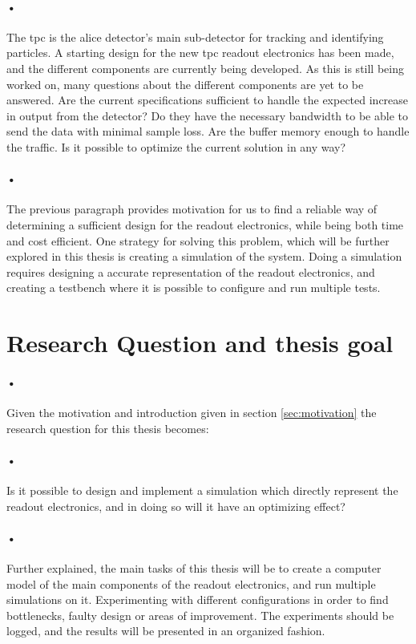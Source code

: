 \documentclass[a4paper, 12pt]{report}\dfrac{\right }{•}
\begin{document}
\paragraph{•}
The \gls{tpc} is the \gls{alice} detector's main sub-detector for tracking and identifying particles.
A starting design for the new \gls{tpc} readout electronics has been made, and the different components are currently being developed.
As this is still being worked on, many questions about the different components are yet to be answered.
Are the current specifications sufficient to handle the expected increase in output from the detector?
Do they have the necessary bandwidth to be able to send the data with minimal sample loss.
Are the buffer memory enough to handle the traffic.
Is it possible to optimize the current solution in any way?

\paragraph{•}
The previous paragraph provides motivation for us to find a reliable way of determining a sufficient design for the readout electronics, while being both time and cost efficient.
One strategy for solving this problem, which will be further explored in this thesis is creating a simulation of the system.
Doing a simulation requires designing a accurate representation of the readout electronics, and creating a testbench where it is possible to configure and run multiple tests.


\section{Research Question and thesis goal}

\paragraph{•}
Given the motivation and introduction given in section \ref{sec:motivation} the research question for this thesis becomes:

\paragraph{•}
Is it possible to design and implement a simulation which directly represent the readout electronics, and in doing so will it have an optimizing effect?

\paragraph{•}
Further explained, the main tasks of this thesis will be to create a computer model of the main components of the readout electronics, and run multiple simulations on it.
Experimenting with different configurations in order to find bottlenecks, faulty design or areas of improvement.
The experiments should be logged, and the results will be presented in an organized fashion.
\end{document}
